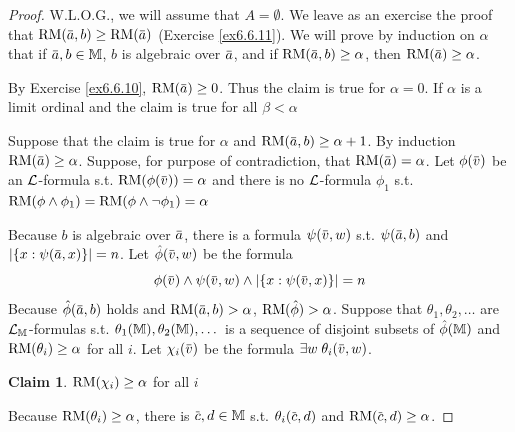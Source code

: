 \documentclass[11pt]{article}
\begin{document}
\begin{proof}
W.L.O.G., we will assume that \(A=\emptyset\). We leave as an exercise the proof
that \(\RM(\bara,b)\ge\RM(\bara)\) (Exercise \ref{ex6.6.11}).
We will prove by induction on \(\alpha\) that if \(\bara,b\in\M\), \(b\) is algebraic over \(\bara\), and
if \(\RM(\bara,b)\ge\alpha\), then \(\RM(\bara)\ge\alpha\).

By Exercise \ref{ex6.6.10}, \(\RM(\bara)\ge 0\). Thus the claim is true for \(\alpha=0\). If \(\alpha\) is a limit
ordinal and the claim is true for all \(\beta<\alpha\)

Suppose that the claim is true for \(\alpha\) and \(\RM(\bara,b)\ge\alpha+1\). By induction \(\RM(\bara)\ge\alpha\).
Suppose, for purpose of contradiction, that \(\RM(\bara)=\alpha\). Let \(\phi(\barv)\) be
an \(\mathcal{L}\)-formula s.t. \(\RM(\phi(\barv))=\alpha\) and there is no \(\mathcal{L}\)-formula \(\phi_1\)
s.t. \(\operatorname{RM}(\phi\wedge\phi_1)=\operatorname{RM}(\phi\wedge\neg\phi_1)=\alpha\)

Because \(b\) is algebraic over \(\bara\), there is a formula \(\psi(\barv,w)\) s.t. \(\psi(\bara,b)\)
and \(\abs{\{x:\psi(\bara,x)\}}=n\). Let \(\hatphi(\barv,w)\) be the formula
\begin{equation*}
\phi(\barv)\wedge\psi(\barv,w)\wedge\abs{\{x:\psi(\barv,x)\}}=n
\end{equation*}
Because \(\hatphi(\bara,b)\) holds and \(\RM(\bara,b)>\alpha\), \(\operatorname{RM}(\hat{\phi})>\alpha\). Suppose
that \(\theta_1,\theta_2,\dots\) are \(\mathcal{L}_{\mathbb{M}}\)-formulas s.t. \(\theta_1(\mathbb{M}),\theta_2(\mathbb{M}),\dots\) is a sequence of disjoint subsets
of \(\hat{\phi}(\mathbb{M})\) and \(\operatorname{RM}(\theta_i)\ge\alpha\) for all \(i\). Let \(\chi_i(\barv)\) be the
formula \(\exists w\;\theta_i(\barv,w)\).

\textbf{Claim 1}. \(\operatorname{RM}(\chi_i)\ge\alpha\) for all \(i\)

Because \(\operatorname{RM}(\theta_i)\ge\alpha\), there is \(\barc,d\in\M\) s.t. \(\theta_i(\barc,d)\) and \(\RM(\barc,d)\ge\alpha\).
\end{proof}
\end{document}

